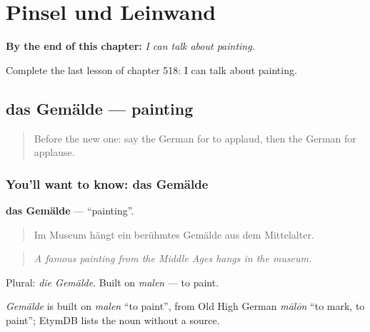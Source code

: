 
\chapter{Pinsel und Leinwand}
\label{ch:ge-pinsel-und-leinwand}

\begin{chapteropening}
\textbf{By the end of this chapter:} \emph{I can talk about painting.}

Complete the last lesson of chapter 518: I can talk about painting.
\end{chapteropening}

\section[das Gemälde]{das Gemälde — painting}

\label{lesson:GE-C518-gemaelde}



\begin{quote}
Before the new one: say the German for to applaud, then the German for applause.
\end{quote}

\subsection*{You'll want to know: das Gemälde}
\textbf{das Gemälde} — \textquotedblleft{}painting\textquotedblright{}.

\begin{quote}
Im Museum hängt ein berühmtes Gemälde aus dem Mittelalter.
\end{quote}

\begin{quote}
\emph{A famous painting from the Middle Ages hangs in the museum.}
\end{quote}

Plural: \emph{die Gemälde}. Built on \emph{malen} — to paint.

\begin{cousinweb}
\emph{Gemälde} is built on \emph{malen} \textquotedblleft{}to paint\textquotedblright{}, from Old High German \emph{mālōn} \textquotedblleft{}to mark, to paint\textquotedblright{}; EtymDB lists the noun without a source.
\end{cousinweb}

